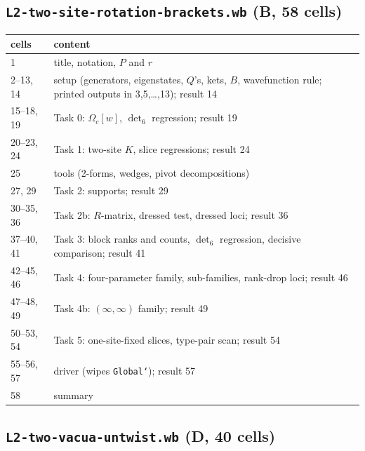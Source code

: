 \documentclass[10pt]{article}
\newcommand{\Om}{\Omega}
\begin{document}
\subsection{\texttt{L2-two-site-rotation-brackets.wb} (B, 58 cells)}

\begin{center}\small\setlength{\tabcolsep}{3pt}\begin{longtable}{@{}lp{13cm}@{}}\toprule
\textbf{cells} & \textbf{content} \\\midrule\endhead
1 & title, notation, $P$ and $r$ \\
2--13, 14 & setup (generators, eigenstates, $Q$'s, kets, $B$, wavefunction rule; printed outputs in 3,5,\dots,13); result 14 \\
15--18, 19 & Task 0: $\Om_c[w]$, $\det_6$ regression; result 19 \\
20--23, 24 & Task 1: two-site $K$, slice regressions; result 24 \\
25 & tools (2-forms, wedges, pivot decompositions) \\
27, 29 & Task 2: supports; result 29 \\
30--35, 36 & Task 2b: $R$-matrix, dressed test, dressed loci; result 36 \\
37--40, 41 & Task 3: block ranks and counts, $\det_6$ regression, decisive comparison; result 41 \\
42--45, 46 & Task 4: four-parameter family, sub-families, rank-drop loci; result 46 \\
47--48, 49 & Task 4b: $(\infty,\infty)$ family; result 49 \\
50--53, 54 & Task 5: one-site-fixed slices, type-pair scan; result 54 \\
55--56, 57 & driver (wipes \texttt{Global`}); result 57 \\
58 & summary \\\bottomrule
\end{longtable}\end{center}

\subsection{\texttt{L2-two-vacua-untwist.wb} (D, 40 cells)}
\end{document}
